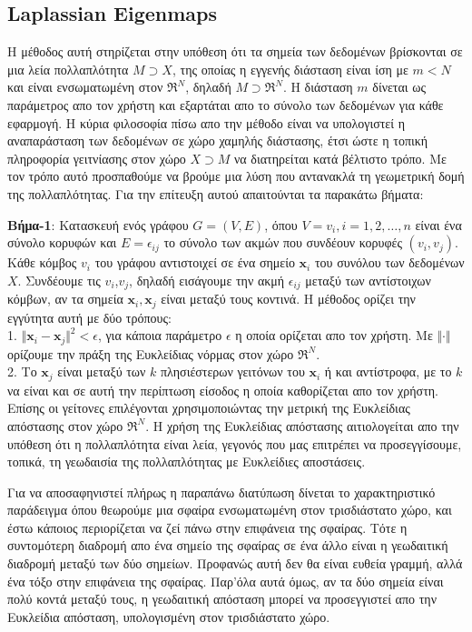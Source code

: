 \subsection{\textlatin{Laplassian Eigenmaps}}
\par
Η μέθοδος αυτή στηρίζεται στην υπόθεση ότι τα σημεία των δεδομένων βρίσκονται σε μια λεία πολλαπλότητα $ Μ \supset Χ $, της οποίας η εγγενής διάσταση είναι ίση με $m<N$ και είναι ενσωματωμένη στον $ \Re^{N} $, δηλαδή $ Μ \supset \Re^{N} $. Η διάσταση $m$ δίνεται ως παράμετρος απο τον χρήστη και εξαρτάται απο το σύνολο των δεδομένων για κάθε εφαρμογή. Η κύρια φιλοσοφία πίσω απο την μέθοδο είναι να υπολογιστεί η αναπαράσταση των δεδομένων σε χώρο χαμηλής διάστασης, έτσι ώστε η τοπική πληροφορία γειτνίασης στον χώρο $Χ \supset M$ να διατηρείται κατά βέλτιστο τρόπο. Με τον τρόπο αυτό προσπαθούμε να βρούμε μια λύση που αντανακλά τη γεωμετρική δομή της πολλαπλότητας. Για την επίτευξη αυτού απαιτούνται τα παρακάτω βήματα:
\par
\textbf{Βήμα-1}: Κατασκευή ενός γράφου $G=(V,E)$, όπου $V={v_{i},i=1,2,\ldots,n}$ είναι ένα σύνολο κορυφών και $E={\epsilon_{ij}}$ το σύνολο των ακμών που συνδέουν κορυφές $(v_{i},v_{j})$. Κάθε κόμβος $v_{i}$ του γράφου αντιστοιχεί σε ένα σημείο $\mathbf{x}_{i}$ του συνόλου των δεδομένων $X$. Συνδέουμε τις $v_{i}$,$v_{j}$, δηλαδή εισάγουμε την ακμή $\epsilon_{ij}$ μεταξύ των αντίστοιχων κόμβων, αν τα σημεία $\mathbf{x}_{i},\mathbf{x}_{j}$ είναι μεταξύ τους κοντινά. Η μέθοδος ορίζει την εγγύτητα αυτή με δύο τρόπους: \\
1. $\Vert \mathbf{x}_{i}-\mathbf{x}_{j} \Vert ^{2} < \epsilon $, για κάποια παράμετρο $\epsilon$ η οποία ορίζεται απο τον χρήστη. Με $\Vert\cdot\Vert$ ορίζουμε την πράξη της Ευκλείδιας νόρμας στον χώρο $\Re^{N}$. \\
2. Το $\mathbf{x}_{j}$ είναι μεταξύ των $k$ πλησιέστερων γειτόνων του $\mathbf{x}_{i}$ ή και αντίστροφα, με το $k$ να είναι και σε αυτή την περίπτωση είσοδος η οποία καθορίζεται απο τον χρήστη. Επίσης οι γείτονες επιλέγονται χρησιμοποιώντας την μετρική της Ευκλείδιας απόστασης στον χώρο $\Re^{N}$. Η χρήση της Ευκλείδιας απόστασης αιτιολογείται απο την υπόθεση ότι η πολλαπλότητα είναι λεία, γεγονός που μας επιτρέπει να προσεγγίσουμε, τοπικά, τη γεωδαισία της πολλαπλότητας με Ευκλείδιες αποστάσεις.
\par
Για να αποσαφηνιστεί πλήρως η παραπάνω διατύπωση δίνεται το χαρακτηριστικό παράδειγμα όπου θεωρούμε μια σφαίρα ενσωματωμένη στον τρισδιάστατο χώρο, και έστω κάποιος περιορίζεται να ζεί πάνω στην επιφάνεια της σφαίρας. Τότε η συντομότερη διαδρομή απο ένα σημείο της σφαίρας σε ένα άλλο είναι η γεωδαιτική διαδρομή μεταξύ των δύο σημείων. Προφανώς αυτή δεν θα είναι ευθεία γραμμή, αλλά ένα τόξο στην επιφάνεια της σφαίρας. Παρ'όλα αυτά όμως, αν τα δύο σημεία είναι πολύ κοντά μεταξύ τους, η γεωδαιτική απόσταση μπορεί να προσεγγιστεί απο την Ευκλείδια απόσταση, υπολογισμένη στον τρισδιάστατο χώρο.
